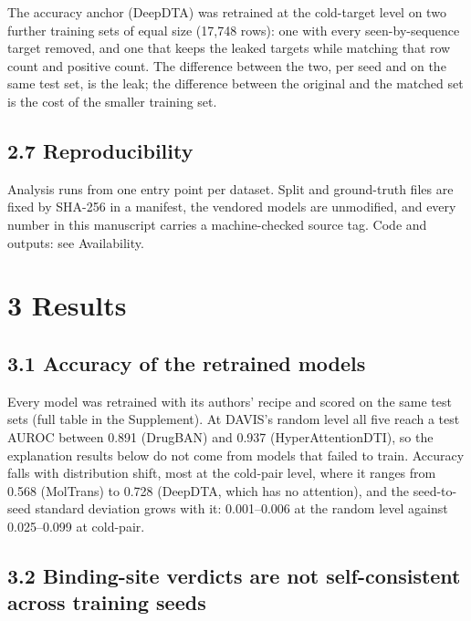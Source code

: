 The accuracy anchor (DeepDTA) was retrained at the cold-target level on two further training sets of equal size (17,748 rows): one with every seen-by-sequence target removed, and one that keeps the leaked targets while matching that row count and positive count. The difference between the two, per seed and on the same test set, is the leak; the difference between the original and the matched set is the cost of the smaller training set.

\subsection{2.7 Reproducibility}\label{reproducibility}

Analysis runs from one entry point per dataset. Split and ground-truth files are fixed by SHA-256 in a manifest, the vendored models are unmodified, and every number in this manuscript carries a machine-checked source tag. Code and outputs: see Availability.

\section{3 Results}\label{results}

\subsection{3.1 Accuracy of the retrained models}\label{accuracy-of-the-retrained-models}

Every model was retrained with its authors' recipe and scored on the same test sets (full table in the Supplement). At DAVIS's random level all five reach a test AUROC between 0.891 (DrugBAN) and 0.937 (HyperAttentionDTI), so the explanation results below do not come from models that failed to train. Accuracy falls with distribution shift, most at the cold-pair level, where it ranges from 0.568 (MolTrans) to 0.728 (DeepDTA, which has no attention), and the seed-to-seed standard deviation grows with it: 0.001--0.006 at the random level against 0.025--0.099 at cold-pair.

\subsection{3.2 Binding-site verdicts are not self-consistent across training seeds}\label{binding-site-verdicts-are-not-self-consistent-across-training-seeds}

